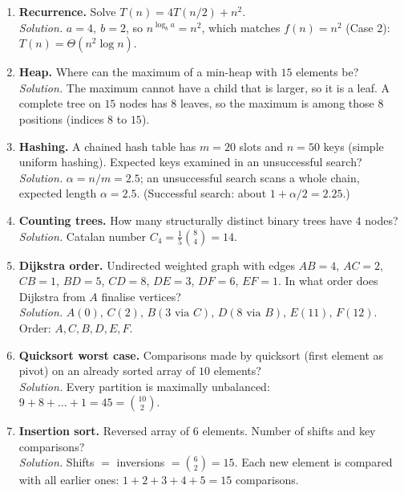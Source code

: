 \documentclass[11pt,a4paper]{article}
\begin{document}
\begin{enumerate}[leftmargin=*,itemsep=6pt]
\item \textbf{Recurrence.} Solve $T(n)=4T(n/2)+n^2$.\\
\emph{Solution.} $a=4,\ b=2$, so $n^{\log_b a}=n^2$, which matches $f(n)=n^2$ (Case 2): $T(n)=\Theta(n^2\log n)$.

\item \textbf{Heap.} Where can the maximum of a min-heap with $15$ elements be?\\
\emph{Solution.} The maximum cannot have a child that is larger, so it is a leaf. A complete tree on $15$ nodes has $8$ leaves, so the maximum is among those $8$ positions (indices $8$ to $15$).

\item \textbf{Hashing.} A chained hash table has $m=20$ slots and $n=50$ keys (simple uniform hashing). Expected keys examined in an unsuccessful search?\\
\emph{Solution.} $\alpha=n/m=2.5$; an unsuccessful search scans a whole chain, expected length $\alpha=2.5$. (Successful search: about $1+\alpha/2=2.25$.)

\item \textbf{Counting trees.} How many structurally distinct binary trees have $4$ nodes?\\
\emph{Solution.} Catalan number $C_4=\frac1{5}\binom84=14$.

\item \textbf{Dijkstra order.} Undirected weighted graph with edges $AB{=}4$, $AC{=}2$, $CB{=}1$, $BD{=}5$, $CD{=}8$, $DE{=}3$, $DF{=}6$, $EF{=}1$. In what order does Dijkstra from $A$ finalise vertices?\\
\emph{Solution.} $A(0),\,C(2),\,B(3\text{ via }C),\,D(8\text{ via }B),\,E(11),\,F(12)$. Order: $A,C,B,D,E,F$.

\item \textbf{Quicksort worst case.} Comparisons made by quicksort (first element as pivot) on an already sorted array of $10$ elements?\\
\emph{Solution.} Every partition is maximally unbalanced: $9+8+\dots+1=45=\binom{10}{2}$.

\item \textbf{Insertion sort.} Reversed array of $6$ elements. Number of shifts and key comparisons?\\
\emph{Solution.} Shifts $=$ inversions $=\binom62=15$. Each new element is compared with all earlier ones: $1+2+3+4+5=15$ comparisons.


\end{enumerate}
\end{document}
